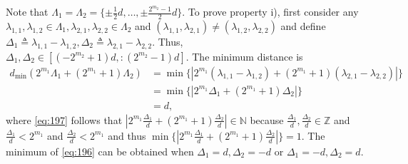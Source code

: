 \documentclass[12pt, draftclsnofoot, onecolumn]{IEEEtran}
\theoremstyle{definition}
\begin{document}
\begin{IEEEproof}
Note that $\Lambda_1 = \Lambda_2=\{\pm\frac{1}{2}d,\ldots, \pm\frac{2^{m_2}-1}{2}d\}$. To prove property i), first consider any $\lambda_{1,1},\lambda_{1,2} \in \Lambda_1,\lambda_{2,1},\lambda_{2,2} \in \Lambda_2$ and $(\lambda_{1,1},\lambda_{2,1})\neq (\lambda_{1,2}, \lambda_{2,2})$ and define $\Delta_1 \triangleq \lambda_{1,1}-\lambda_{1,2},\Delta_2\triangleq \lambda_{2,1}-\lambda_{2,2}$. Thus, $\Delta_1,\Delta_2\in [(-2^{m_2}+1)d,:(2^{m_2}-1)d]$. The minimum distance is
\begin{subequations}
\begin{align}
d_{\min}(2^{m_1}\Lambda_1+(2^{m_1}+1)\Lambda_2) &= \min\{|2^{m_1}(\lambda_{1,1}-\lambda_{1,2})+(2^{m_1}+1)(\lambda_{2,1} -\lambda_{2,2})|\} \nonumber \\
& = \min\{|2^{m_1}\Delta_1+(2^{m_1}+1)\Delta_2|\} \label{eq:196} \\
&= d,\label{eq:197}
\end{align}
\end{subequations}
where \eqref{eq:197} follows that $|2^{m_1}\frac{\Delta_1}{d}+(2^{m_1}+1)\frac{\Delta_2}{d}| \in \mathbb{N}$ because $\frac{\Delta_1}{d},\frac{\Delta_2}{d} \in \mathbb{Z}$ and $\frac{\Delta_1}{d}<2^{m_1}$ and $\frac{\Delta_2}{d}<2^{m_1}$ and thus $\min\{|2^{m_1}\frac{\Delta_1}{d}+(2^{m_1}+1)\frac{\Delta_2}{d}|\}=1$. The minimum of \eqref{eq:196} can be obtained when $\Delta_1 = d,\Delta_2 = -d$ or $\Delta_1 = -d,\Delta_2 = d$.




\end{IEEEproof}
\end{document}
